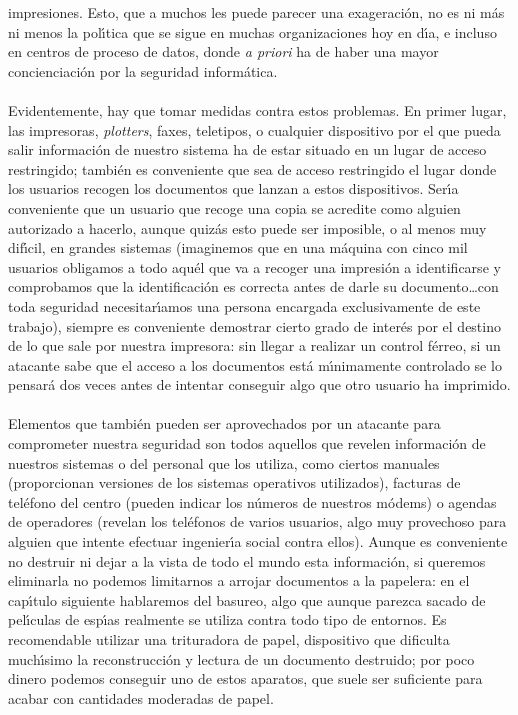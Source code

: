 impresiones. Esto, que a muchos les puede parecer una exageraci\'on, no es ni
m\'as ni menos la pol\'{\i}tica que se sigue en muchas organizaciones hoy en
d\'{\i}a, e incluso en centros de proceso de datos, donde {\it a priori} ha de
haber una mayor concienciaci\'on por la seguridad inform\'atica.\\
\\Evidentemente, hay que tomar medidas contra estos problemas. En primer lugar,
las impresoras, {\it plotters}, faxes, teletipos, o cualquier dispositivo por
el que pueda salir informaci\'on de nuestro sistema ha de estar situado en un
lugar de acceso restringido; tambi\'en es conveniente que sea de acceso 
restringido el lugar donde los usuarios recogen los documentos que lanzan a 
estos dispositivos. Ser\'{\i}a conveniente que un usuario que recoge una copia
se acredite como alguien autorizado a hacerlo, aunque quiz\'as esto puede ser
imposible, o al menos muy dif\'{\i}cil, en grandes sistemas (imaginemos que 
en una m\'aquina con cinco mil usuarios obligamos a todo aqu\'el que va a 
recoger una impresi\'on a identificarse y comprobamos que la identificaci\'on
es correcta antes de darle su documento\ldots con toda seguridad 
necesitar\'{\i}amos una persona encargada exclusivamente de este trabajo), 
siempre es conveniente demostrar cierto grado de inter\'es por el destino de
lo que sale por nuestra impresora: sin llegar a realizar un control f\'erreo,
si un atacante sabe que el acceso a los documentos est\'a m\'{\i}nimamente
controlado se lo pensar\'a dos veces antes de intentar conseguir algo que otro
usuario ha imprimido.\\
\\Elementos que tambi\'en pueden ser aprovechados por un atacante para 
comprometer nuestra seguridad son todos aquellos que revelen informaci\'on de
nuestros sistemas o del personal que los utiliza, como ciertos manuales 
(proporcionan versiones de los sistemas operativos utilizados), facturas de 
tel\'efono del centro (pueden indicar los n\'umeros de nuestros m\'odems) o
agendas de operadores (revelan los tel\'efonos de varios usuarios, algo muy
provechoso para alguien que intente efectuar ingenier\'{\i}a social contra
ellos). Aunque es conveniente no destruir ni dejar a la vista de todo el mundo
esta informaci\'on, si queremos eliminarla no podemos limitarnos a arrojar
documentos a la papelera: en el cap\'{\i}tulo siguiente hablaremos del 
basureo, algo que aunque parezca sacado de pel\'{\i}culas de esp\'{\i}as 
realmente se utiliza contra todo tipo de entornos. Es
recomendable utilizar una trituradora de papel, dispositivo que dificulta
much\'{\i}simo la reconstrucci\'on y lectura de un documento destruido; por
poco dinero podemos conseguir uno de estos aparatos, que suele ser suficiente
para acabar con cantidades moderadas de papel.
